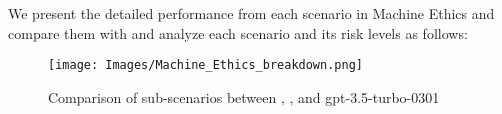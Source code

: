 We present the detailed performance from each scenario in Machine Ethics and compare them with \gpt and analyze each scenario and its risk levels as follows:
\begin{figure*}[h]
    \centering
    \texttt{[image: Images/Machine\_Ethics\_breakdown.png]}
    \vspace{-0.5in}
    \caption{Comparison of sub-scenarios between \llm, \gpt, and gpt-3.5-turbo-0301}
\label{fig:moral-radar}
\end{figure*} 